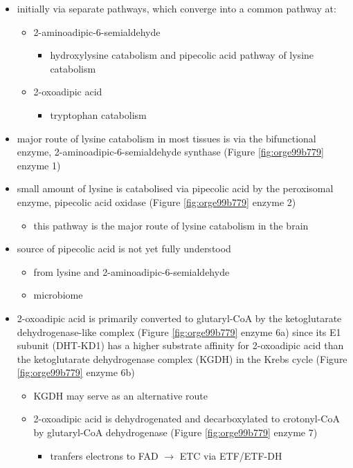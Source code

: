 \documentclass[12pt]{scrartcl}
\begin{document}
\begin{center}
\begin{center}
\begin{itemize}
\item initially via separate pathways, which converge into a common 
pathway at:
\begin{itemize}
\item 2-aminoadipic-6-semialdehyde
\begin{itemize}
\item hydroxylysine catabolism and pipecolic acid pathway of lysine
catabolism
\end{itemize}
\item 2-oxoadipic acid
\begin{itemize}
\item tryptophan catabolism
\end{itemize}
\end{itemize}
\item major route of lysine catabolism in most tissues is via the
bifunctional enzyme, 2-aminoadipic-6-semialdehyde synthase (Figure \ref{fig:orge99b779} enzyme 1)
\item small amount of lysine is catabolised via pipecolic acid by the
peroxisomal enzyme, pipecolic acid oxidase (Figure \ref{fig:orge99b779} enzyme 2)
\begin{itemize}
\item this pathway is the major route of lysine catabolism in the
brain
\end{itemize}
\item source of pipecolic acid is not yet fully understood
\begin{itemize}
\item from lysine and 2-aminoadipic-6-semialdehyde
\item microbiome
\end{itemize}
\item 2-oxoadipic acid is primarily converted to glutaryl-CoA by the
ketoglutarate dehydrogenase-like complex (Figure \ref{fig:orge99b779} enzyme 6a)
since its E1 subunit (DHT-KD1) has a higher substrate affinity for
2-oxoadipic acid than the ketoglutarate dehydrogenase complex (KGDH) in
the Krebs cycle (Figure \ref{fig:orge99b779} enzyme 6b)
\begin{itemize}
\item KGDH may serve as an alternative route
\item 2-oxoadipic acid is dehydrogenated and decarboxylated to
crotonyl-CoA by glutaryl-CoA dehydrogenase (Figure \ref{fig:orge99b779} enzyme 7)
\begin{itemize}
\item tranfers electrons to FAD \(\to\) ETC via ETF/ETF-DH

\end{itemize}
\end{itemize}
\end{itemize}
\end{center}
\end{center}
\end{document}

